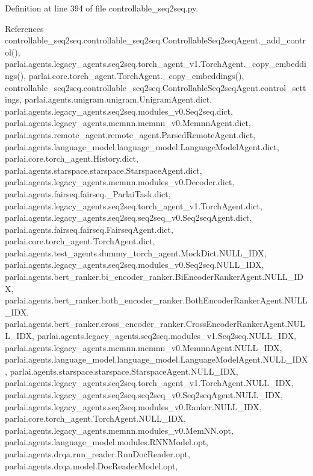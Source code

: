 Definition at line 394 of file controllable\+\_\+seq2seq.\+py.



References controllable\+\_\+seq2seq.\+controllable\+\_\+seq2seq.\+Controllable\+Seq2seq\+Agent.\+\_\+add\+\_\+control(), parlai.\+agents.\+legacy\+\_\+agents.\+seq2seq.\+torch\+\_\+agent\+\_\+v1.\+Torch\+Agent.\+\_\+copy\+\_\+embeddings(), parlai.\+core.\+torch\+\_\+agent.\+Torch\+Agent.\+\_\+copy\+\_\+embeddings(), controllable\+\_\+seq2seq.\+controllable\+\_\+seq2seq.\+Controllable\+Seq2seq\+Agent.\+control\+\_\+settings, parlai.\+agents.\+unigram.\+unigram.\+Unigram\+Agent.\+dict, parlai.\+agents.\+legacy\+\_\+agents.\+seq2seq.\+modules\+\_\+v0.\+Seq2seq.\+dict, parlai.\+agents.\+legacy\+\_\+agents.\+memnn.\+memnn\+\_\+v0.\+Memnn\+Agent.\+dict, parlai.\+agents.\+remote\+\_\+agent.\+remote\+\_\+agent.\+Parsed\+Remote\+Agent.\+dict, parlai.\+agents.\+language\+\_\+model.\+language\+\_\+model.\+Language\+Model\+Agent.\+dict, parlai.\+core.\+torch\+\_\+agent.\+History.\+dict, parlai.\+agents.\+starspace.\+starspace.\+Starspace\+Agent.\+dict, parlai.\+agents.\+legacy\+\_\+agents.\+memnn.\+modules\+\_\+v0.\+Decoder.\+dict, parlai.\+agents.\+fairseq.\+fairseq.\+\_\+\+Parlai\+Task.\+dict, parlai.\+agents.\+legacy\+\_\+agents.\+seq2seq.\+torch\+\_\+agent\+\_\+v1.\+Torch\+Agent.\+dict, parlai.\+agents.\+legacy\+\_\+agents.\+seq2seq.\+seq2seq\+\_\+v0.\+Seq2seq\+Agent.\+dict, parlai.\+agents.\+fairseq.\+fairseq.\+Fairseq\+Agent.\+dict, parlai.\+core.\+torch\+\_\+agent.\+Torch\+Agent.\+dict, parlai.\+agents.\+test\+\_\+agents.\+dummy\+\_\+torch\+\_\+agent.\+Mock\+Dict.\+N\+U\+L\+L\+\_\+\+I\+DX, parlai.\+agents.\+legacy\+\_\+agents.\+seq2seq.\+modules\+\_\+v0.\+Seq2seq.\+N\+U\+L\+L\+\_\+\+I\+DX, parlai.\+agents.\+bert\+\_\+ranker.\+bi\+\_\+encoder\+\_\+ranker.\+Bi\+Encoder\+Ranker\+Agent.\+N\+U\+L\+L\+\_\+\+I\+DX, parlai.\+agents.\+bert\+\_\+ranker.\+both\+\_\+encoder\+\_\+ranker.\+Both\+Encoder\+Ranker\+Agent.\+N\+U\+L\+L\+\_\+\+I\+DX, parlai.\+agents.\+bert\+\_\+ranker.\+cross\+\_\+encoder\+\_\+ranker.\+Cross\+Encoder\+Ranker\+Agent.\+N\+U\+L\+L\+\_\+\+I\+DX, parlai.\+agents.\+legacy\+\_\+agents.\+seq2seq.\+modules\+\_\+v1.\+Seq2seq.\+N\+U\+L\+L\+\_\+\+I\+DX, parlai.\+agents.\+legacy\+\_\+agents.\+memnn.\+memnn\+\_\+v0.\+Memnn\+Agent.\+N\+U\+L\+L\+\_\+\+I\+DX, parlai.\+agents.\+language\+\_\+model.\+language\+\_\+model.\+Language\+Model\+Agent.\+N\+U\+L\+L\+\_\+\+I\+DX, parlai.\+agents.\+starspace.\+starspace.\+Starspace\+Agent.\+N\+U\+L\+L\+\_\+\+I\+DX, parlai.\+agents.\+legacy\+\_\+agents.\+seq2seq.\+torch\+\_\+agent\+\_\+v1.\+Torch\+Agent.\+N\+U\+L\+L\+\_\+\+I\+DX, parlai.\+agents.\+legacy\+\_\+agents.\+seq2seq.\+seq2seq\+\_\+v0.\+Seq2seq\+Agent.\+N\+U\+L\+L\+\_\+\+I\+DX, parlai.\+agents.\+legacy\+\_\+agents.\+seq2seq.\+modules\+\_\+v0.\+Ranker.\+N\+U\+L\+L\+\_\+\+I\+DX, parlai.\+core.\+torch\+\_\+agent.\+Torch\+Agent.\+N\+U\+L\+L\+\_\+\+I\+DX, parlai.\+agents.\+legacy\+\_\+agents.\+memnn.\+modules\+\_\+v0.\+Mem\+N\+N.\+opt, parlai.\+agents.\+language\+\_\+model.\+modules.\+R\+N\+N\+Model.\+opt, parlai.\+agents.\+drqa.\+rnn\+\_\+reader.\+Rnn\+Doc\+Reader.\+opt, parlai.\+agents.\+drqa.\+model.\+Doc\+Reader\+Model.\+opt, 